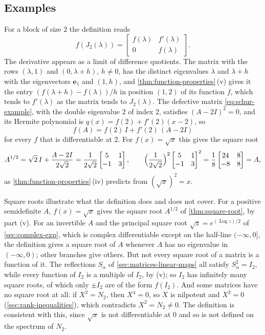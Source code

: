 \subsection{Examples}

For a block of size $2$ the definition reads
\[
f(J_2(\lambda))=\begin{bmatrix}f(\lambda)&f'(\lambda)\\0&f(\lambda)\end{bmatrix}.
\]
The derivative appears as a limit of difference quotients. The matrix with the rows $(\lambda,1)$ and $(0,\lambda+h)$, $h\ne0$, has the distinct eigenvalues $\lambda$ and $\lambda+h$ with the eigenvectors $\mathbf e_1$ and $(1,h)$, and \cref{thm:function-properties}\,(v) gives it the entry $(f(\lambda+h)-f(\lambda))/h$ in position $(1,2)$ of its function $f$, which tends to $f'(\lambda)$ as the matrix tends to $J_2(\lambda)$. The defective matrix \eqref{eq:schur-example}, with the double eigenvalue $2$ of index $2$, satisfies $(A-2I)^2=0$, and its Hermite polynomial is $q(x)=f(2)+f'(2)(x-2)$, so
\[
f(A)=f(2)\,I+f'(2)\,(A-2I)
\]
for every $f$ that is differentiable at $2$. For $f(x)=\sqrt x$ this gives the square root
\[
A^{1/2}=\sqrt2\,I+\frac{A-2I}{2\sqrt2}=\frac1{2\sqrt2}\begin{bmatrix}5&1\\-1&3\end{bmatrix},\qquad\Bigl(\frac1{2\sqrt2}\Bigr)^2\begin{bmatrix}5&1\\-1&3\end{bmatrix}^2=\frac18\begin{bmatrix}24&8\\-8&8\end{bmatrix}=A ,
\]
as \cref{thm:function-properties}\,(iv) predicts from $(\sqrt x)^2=x$.

Square roots illustrate what the definition does and does not cover. For a positive semidefinite $A$, $f(x)=\sqrt x$ gives the square root $A^{1/2}$ of \cref{thm:square-root}, by part (v). For an invertible $A$ and the principal square root $\sqrt z=e^{(\operatorname{Log}z)/2}$ of \cref{sec:complex-exp}, which is complex differentiable except on the half-line $(-\infty,0]$, the definition gives a square root of $A$ whenever $A$ has no eigenvalue in $(-\infty,0)$; other branches give others. But not every square root of a matrix is a function of it. The reflections $S_\alpha$ of \cref{sec:matrices-linear-maps} all satisfy $S_\alpha^2=I_2$, while every function of $I_2$ is a multiple of $I_2$, by (v); so $I_2$ has infinitely many square roots, of which only $\pm I_2$ are of the form $f(I_2)$. And some matrices have no square root at all: if $X^2=N_2$, then $X^4=0$, so $X$ is nilpotent and $X^2=0$ (\cref{sec:rank-inequalities}), which contradicts $X^2=N_2\ne0$. The definition is consistent with this, since $\sqrt x$ is not differentiable at $0$ and so is not defined on the spectrum of $N_2$.

